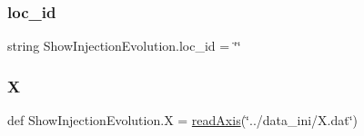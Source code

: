 \subsubsection{\texorpdfstring{loc\+\_\+id}{loc\_id}}
{\footnotesize\ttfamily string Show\+Injection\+Evolution.\+loc\+\_\+id = \char`\"{}\char`\"{}}

\mbox{\label{namespaceShowInjectionEvolution_a42b56552665798d4038f9992f1dfb229}} 
\subsubsection{\texorpdfstring{X}{X}}
{\footnotesize\ttfamily def Show\+Injection\+Evolution.\+X = \hyperlink{namespaceShowInjectionEvolution_a2380d6044884c630c5e40c94605fa2b5}{read\+Axis}(\char`\"{}../data\+\_\+ini/X.\+dat\char`\"{})}

